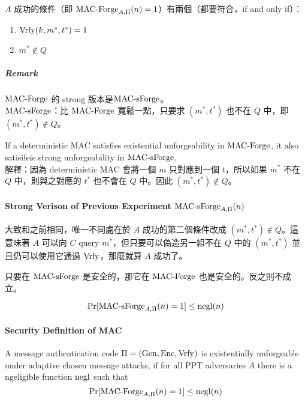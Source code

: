 \(A\) 成功的條件（即 \(\operatorname{\mathrm{MAC-Forge}}_{A, \Pi}(n) = 1\)）有兩個（都要符合，if and only if）：
\begin{enumerate}[topsep=-\parskip, label=(\arabic*)]
	\item \(\operatorname{\mathrm{Vrfy}}(k, m^\ast, t^\ast) = 1\)
	\item \(m^\ast \not\in Q\)
\end{enumerate}

\subparagraph{Remark}

\(\operatorname{\mathrm{MAC-Forge}}\) 的 strong 版本是\(\operatorname{\mathrm{MAC-sForge}}\)。 \\
\(\operatorname{\mathrm{MAC-sForge}}\)：比 \(\operatorname{\mathrm{MAC-Forge}}\) 寬鬆一點，只要求 \((m^\ast, t^\ast)\) 也不在 \(Q\) 中，即 \((m^\ast, t^\ast) \not\in Q\)。

If a deterministic MAC satisfies existential unforgeability in \(\operatorname{\mathrm{MAC-Forge}}\), it also satisifeis strong unforgeability in \(\operatorname{\mathrm{MAC-sForge}}\). \\
解釋：因為 deterministic MAC 會將一個 \(m\) 只對應到一個 \(t\)，所以如果 \(m^\ast\) 不在 \(Q\) 中，則與之對應的 \(t^\ast\) 也不會在 \(Q\) 中。因此 \((m^\ast, t^\ast) \not\in Q\)。


\paragraph{Strong Verison of Previous Experiment \quad \(\operatorname{\mathrm{MAC-sForge}}_{A, \Pi}(n)\)}

大致和之前相同，唯一不同處在於 \(A\) 成功的第二個條件改成 \((m^\ast, t^\ast) \not\in Q\)。這意味著 \(A\) 可以向 \(C\) query \(m^\ast\)，但只要可以偽造另一組不在 \(Q\) 中的 \((m^\ast, t^\ast)\) 並且仍可以使用它通過 \(\operatorname{\mathrm{Vrfy}}\)，那麼就算 \(A\) 成功了。

只要在 \(\operatorname{\mathrm{MAC-sForge}}\) 是安全的，那它在 \(\operatorname{\mathrm{MAC-Forge}}\) 也是安全的。反之則不成立。
\begin{definition}
	\[ \Pr[\operatorname{\mathrm{MAC-sForge}}_{A, \Pi}(n) = 1] \leq \operatorname{negl}(n) \]
\end{definition}


\paragraph{Security Definition of MAC}

\begin{definition}
	A message authentication code \(\Pi = (\operatorname{Gen}, \operatorname{Enc}, \operatorname{\mathrm{Vrfy}})\) is existentially unforgeable under adaptive chosen message attacks, if for all PPT adversaries \(A\) there is a ngeligible function \(\operatorname{negl}\) such that
	\[ \Pr[\operatorname{\mathrm{MAC-Forge}}_{A, \Pi}(n) = 1] \leq \operatorname{negl}(n) \]
\end{definition}


